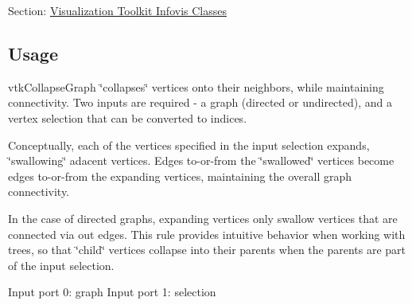 Section\-: \hyperlink{sec_vtkinfovis}{Visualization Toolkit Infovis Classes} \hypertarget{vtkwidgets_vtkxyplotwidget_Usage}{}\subsection{Usage}\label{vtkwidgets_vtkxyplotwidget_Usage}
vtk\-Collapse\-Graph \char`\"{}collapses\char`\"{} vertices onto their neighbors, while maintaining connectivity. Two inputs are required -\/ a graph (directed or undirected), and a vertex selection that can be converted to indices.

Conceptually, each of the vertices specified in the input selection expands, \char`\"{}swallowing\char`\"{} adacent vertices. Edges to-\/or-\/from the \char`\"{}swallowed\char`\"{} vertices become edges to-\/or-\/from the expanding vertices, maintaining the overall graph connectivity.

In the case of directed graphs, expanding vertices only swallow vertices that are connected via out edges. This rule provides intuitive behavior when working with trees, so that \char`\"{}child\char`\"{} vertices collapse into their parents when the parents are part of the input selection.

Input port 0\-: graph Input port 1\-: selection

